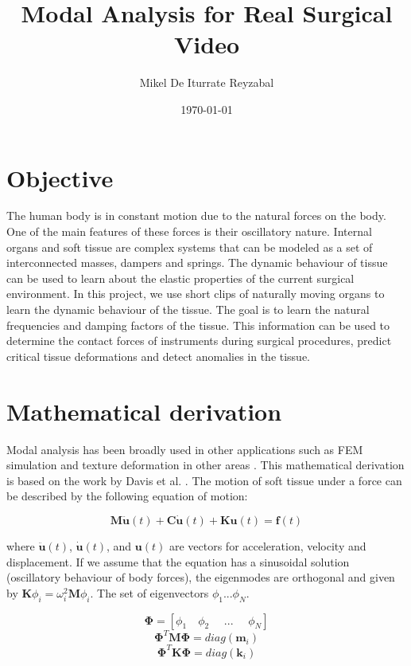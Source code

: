 \documentclass{article}
\title{Modal Analysis for Real Surgical Video}
\author{Mikel De Iturrate Reyzabal}
\date{\today}
\begin{document}
\maketitle
\section{Objective}

The human body is in constant motion due to the natural forces on the body. One of the main features of these forces is their oscillatory nature. Internal organs and soft tissue are complex systems that can be modeled as a set of interconnected masses, dampers and springs. The dynamic behaviour of tissue can be used to learn about the elastic properties of the current surgical environment. In this project, we use short clips of naturally moving organs to learn the dynamic behaviour of the tissue. The goal is to learn the natural frequencies and damping factors of the tissue. This information can be used to determine the contact forces of instruments during surgical procedures, predict critical tissue deformations and detect anomalies in the tissue.

\section{Mathematical derivation}
Modal analysis has been broadly used in other applications such as FEM simulation and texture deformation in other areas \cite{reddy_junthula_introduction_2013,james_dyrt_2002,hauser_interactive_2003,huang_interactive_2011, li_space-time_2014}. This mathematical derivation is based on the work by Davis et al. \cite{davis_image-space_2015}. The motion of soft tissue under a force can be described by the following equation of motion:

\begin{equation*}
    \mathbf{M\ddot{u}}(t) + \mathbf{C\dot{u}}(t) + \mathbf{Ku}(t) = \mathbf{f}(t)
\end{equation*}

where $\mathbf{\ddot{u}}(t)$, $\mathbf{\dot{u}}(t)$, and $\mathbf{u}(t)$ are vectors for acceleration, velocity and displacement. If we assume that the equation has a sinusoidal solution (oscillatory behaviour of body forces), the eigenmodes are orthogonal and given by $\mathbf{K} \phi_{i} = \omega^{2}_{i} \mathbf{M} \phi_{i}$. The set of eigenvectors $\phi_{1} \text{...} \phi_{N}$.

\begin{equation*}
    \mathbf{\Phi} = \left[\phi_{1} \quad \phi_{2} \quad \text{ ... } \quad \phi_{N}\right]
\end{equation*}
\begin{equation*}
    \mathbf{\Phi}^{T}\mathbf{M\Phi} = diag(\mathbf{m}_{i})
\end{equation*}
\begin{equation*}
    \mathbf{\Phi}^{T}\mathbf{K\Phi} = diag(\mathbf{k}_{i})
\end{equation*}
\end{document}
